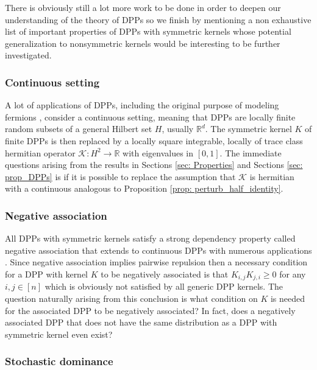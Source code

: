 \documentclass{article}
\numberwithin{equation}{section}
\renewcommand{\geq}{\geqslant}
\newcommand{\bR}{\mathbb{R}}
\theoremstyle{plain}
\begin{document}
\noindent There is obviously still a lot more work to be done in order to deepen our understanding of the theory of DPPs so we finish by mentioning a non exhaustive list of important properties of DPPs with symmetric kernels whose potential generalization to nonsymmetric kernels would be interesting to be further investigated.

\subsubsection*{Continuous setting}

A lot of applications of DPPs, including the original purpose of modeling fermions \cite{Macchi}, consider a continuous setting, meaning that DPPs are locally finite random subsets of a general Hilbert set $H$, usually $\bR^d$. The symmetric kernel $K$ of finite DPPs is then replaced by a locally square integrable, locally of trace class hermitian operator $\mathcal{K}:H^2\rightarrow \bR$ with eigenvalues in $[0, 1]$. The immediate questions arising from the results in Sections \ref{sec: Properties} and Sections \ref{sec: prop_DPPs} is if it is possible to replace the assumption that $\mathcal{K}$ is hermitian with a continuous analogous to Proposition \ref{prop: perturb_half_identity}.

\subsubsection*{Negative association}

All DPPs with symmetric kernels satisfy a strong dependency property called negative association \cite{Borcea, Lyons} that extends to continuous DPPs with numerous applications \cite{Ghosh, Poinas17}. Since negative association implies pairwise repulsion then a necessary condition for a DPP with kernel $K$ to be negatively associated is that $K_{i,j}K_{j,i}\geq 0$ for any $i,j\in [n]$ which is obviously not satisfied by all generic DPP kernels. The question naturally arising from this conclusion is what condition on $K$ is needed for the associated DPP to be negatively associated? In fact, does a negatively associated DPP that does not have the same distribution as a DPP with symmetric kernel even exist?

\subsubsection*{Stochastic dominance}
\end{document}

